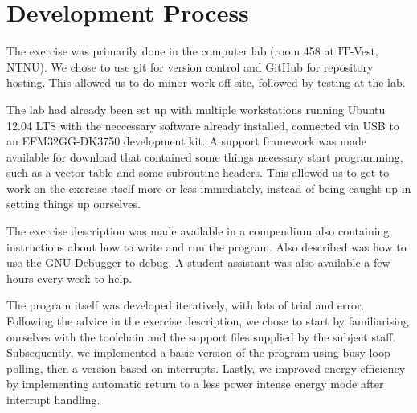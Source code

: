 \section{Development Process}

The exercise was primarily done in the computer lab (room 458 at IT-Vest, NTNU). We chose to use git for version control and GitHub for repository hosting. This allowed us to do minor work off-site, followed by testing at the lab.

The lab had already been set up with multiple workstations running Ubuntu 12.04 LTS with the neccessary software already installed, connected via USB to an EFM32GG-DK3750 development kit. A support framework was made available for download that contained some things necessary start programming, such as a vector table and some subroutine headers. This allowed us to get to work on the exercise itself more or less immediately, instead of being caught up in setting things up ourselves.

The exercise description was made available in a compendium also containing instructions about how to write and run the program. Also described was how to use the GNU Debugger to debug. A student assistant was also available a few hours every week to help.

The program itself was developed iteratively, with lots of trial and error. Following the advice in the exercise description, we chose to start by familiarising ourselves with the toolchain and the support files supplied by the subject staff. Subsequently, we implemented a basic version of the program using busy-loop polling, then a version based on interrupts. Lastly, we improved energy efficiency by implementing automatic return to a less power intense energy mode after interrupt handling.

